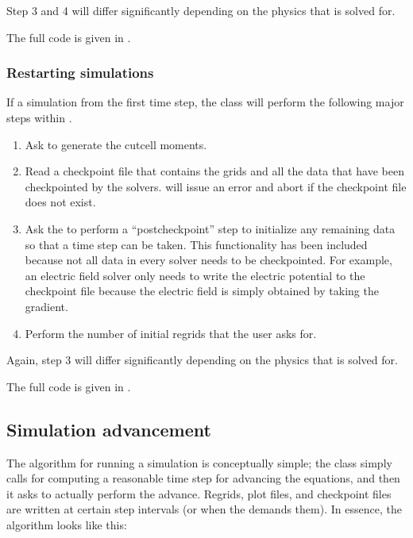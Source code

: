\documentclass[letterpaper,10pt,english]{sphinxmanual}
\begin{document}
Step 3 and 4 will differ significantly depending on the physics that is solved for.

The full code is given in .


\subsubsection{Restarting simulations}
\label{\detokenize{Source/Driver:restarting-simulations}}
If a simulation  from the first time step, the  class will perform the following major steps within .
\begin{enumerate}
%
\item {} 
Ask  to generate the cut\sphinxhyphen{}cell moments.

\item {} 
Read a checkpoint file that contains the grids and all the data that have been checkpointed by the solvers.
 will issue an error and abort if the checkpoint file does not exist.

\item {} 
Ask the  to perform a “post\sphinxhyphen{}checkpoint” step to initialize any remaining data so that a time step can be taken.
This functionality has been included because not all data in every solver needs to be checkpointed.
For example, an electric field solver only needs to write the electric potential to the checkpoint file because the electric field is simply obtained by taking the gradient.

\item {} 
Perform the number of initial regrids that the user asks for.

\end{enumerate}

Again, step 3 will differ significantly depending on the physics that is solved for.

The full code is given in .


\subsection{Simulation advancement}
\label{\detokenize{Source/Driver:simulation-advancement}}
The algorithm for running a simulation is conceptually simple; the  class simply calls  for computing a reasonable time step for advancing the equations, and then it asks  to actually perform the advance.
Regrids, plot files, and checkpoint files are written at certain step intervals (or when the  demands them).
In essence, the algorithm looks like this:
\end{document}
